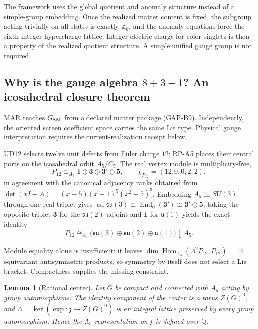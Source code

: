 \documentclass[11pt]{article}
\newtheorem{lemma}[theorem]{Lemma}
\begin{document}
The framework uses the global quotient and anomaly structure instead of a simple-group embedding. Once the realized matter content is fixed, the subgroup acting trivially on all states is exactly $\mathbb Z_6$, and the anomaly equations force the sixth-integer hypercharge lattice. Integer electric charge for color singlets is then a property of the realized quotient structure. A simple unified gauge group is not required.

\subsection{Why is the gauge algebra \texorpdfstring{$8+3+1$}{8+3+1}? An icosahedral closure theorem}

MAR reaches \(G_{\rm SM}\) from a declared matter package (GAP-B9).
Independently, the oriented screen coefficient space carries the same Lie type.
Physical gauge interpretation requires the current-realization receipt below.

UD12 selects twelve unit defects from Euler charge \(12\); RP-A5 places their
central ports on the icosahedral orbit \(A_5/C_5\). The real vertex module is
multiplicity-free,
\[
  P_{12}\cong_{A_5}\mathbf 1\oplus\mathbf 3\oplus\mathbf 3'\oplus\mathbf 5,
  \qquad
  \chi_{P_{12}}=(12,0,0,2,2),
\]
in agreement with the canonical adjacency ranks obtained from
\(\det(xI-A)=(x-5)(x+1)^5(x^2-5)^3\). Embedding \(A_5\) in \(SU(3)\) through
one real triplet gives
\(\operatorname{ad}\mathfrak{su}(3)\cong\operatorname{End}_0(\mathbf3')
\cong\mathbf3'\oplus\mathbf5\); taking the opposite triplet \(\mathbf3\) for
the \(\mathfrak{su}(2)\) adjoint and \(\mathbf1\) for \(\mathfrak u(1)\) yields
the exact identity
\[
  P_{12}\cong_{A_5}
  \bigl(\mathfrak{su}(3)\oplus\mathfrak{su}(2)\oplus\mathfrak u(1)\bigr)
  \!\downarrow\!A_5 .
\]

Module equality alone is insufficient: it leaves
\(\dim\operatorname{Hom}_{A_5}(\Lambda^2P_{12},P_{12})=14\) equivariant
antisymmetric products, so symmetry by itself does not select a Lie bracket.
Compactness supplies the missing constraint.

\begin{lemma}[Rational center]
Let \(G\) be compact and connected with \(A_5\) acting by group automorphisms.
The identity component of the center is a torus \(Z(G)^0\), and
\(\Lambda=\ker(\exp:\mathfrak z\to Z(G)^0)\) is an integral lattice preserved
by every group automorphism. Hence the \(A_5\)-representation on \(\mathfrak z\)
is defined over \(\mathbb Q\).
\end{lemma}
\end{document}
